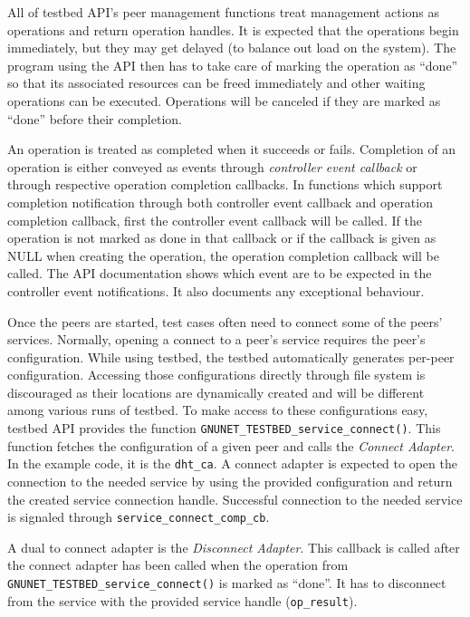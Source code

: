 \documentclass[10pt]{article}
\begin{document}
All of testbed API's peer management functions treat management actions as
operations and return operation handles.  It is expected that the operations
begin immediately, but they may get delayed (to balance out load on the system).
The program using the API then has to take care of marking the operation as
``done'' so that its associated resources can be freed immediately and other
waiting operations can be executed.  Operations will be canceled if they are
marked as ``done'' before their completion.

An operation is treated as completed when it succeeds or fails.  Completion of
an operation is either conveyed as events through \textit{controller event
  callback} or through respective operation completion callbacks.  In functions
which support completion notification through both controller event callback and
operation completion callback, first the controller event callback will be
called.  If the operation is not marked as done in that callback or if the
callback is given as NULL when creating the operation, the operation completion
callback will be called.  The API documentation shows which event are to be
expected in the controller event notifications.  It also documents any
exceptional behaviour.

Once the peers are started, test cases often need to connect some of the peers'
services.  Normally, opening a connect to a peer's service requires the peer's
configuration.  While using testbed, the testbed automatically generates
per-peer configuration.  Accessing those configurations directly through file
system is discouraged as their locations are dynamically created and will be
different among various runs of testbed.  To make access to these configurations
easy, testbed API provides the function
\texttt{GNUNET\_TESTBED\_service\_connect()}.  This function fetches the
configuration of a given peer and calls the \textit{Connect Adapter}.
In the example code, it is the \texttt{dht\_ca}.  A connect adapter is expected
to open the connection to the needed service by using the provided configuration
and return the created service connection handle.  Successful connection to the
needed service is signaled through \texttt{service\_connect\_comp\_cb}.

A dual to connect adapter is the \textit{Disconnect Adapter}.  This callback is
called after the connect adapter has been called when the operation from
\texttt{GNUNET\_TESTBED\_service\_connect()} is marked as ``done''.  It has to
disconnect from the service with the provided service handle (\texttt{op\_result}).
\end{document}
